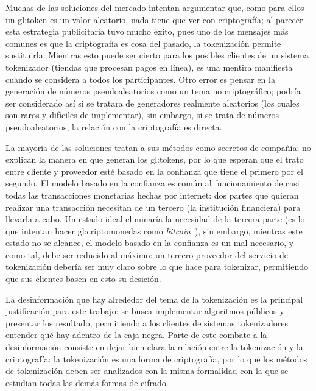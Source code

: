\begin{description}

\end{description}

Muchas de las soluciones del mercado intentan argumentar que, como para ellos
un \gls{gl:token} es un valor aleatorio, nada tiene que ver con criptografía;
al parecer esta estrategia publicitaria tuvo mucho éxito, pues uno de los
mensajes más comunes es que la criptografía es cosa del pasado, la tokenización
permite sustituirla. Mientras esto puede ser cierto para los posibles clientes
de un sistema tokenizador (tiendas que procesan pagos en línea), es una mentira
manifiesta cuando se considera a todos los  participantes. Otro error es pensar
en la generación de números pseudoaleatorios como un tema no criptográfico;
podría ser considerado así si se tratara de generadores realmente aleatorios
(los cuales son raros y difíciles de  implementar), sin embargo, si se trata de
números pseudoaleatorios, la relación con la criptografía es directa.

La mayoría de las soluciones tratan a sus métodos como secretos de compañía: no
explican la manera en que generan los \glspl{gl:token}, por lo que esperan que
el trato entre cliente y proveedor esté basado en la confianza que tiene el
primero por el segundo. El modelo basado en la confianza es común al
funcionamiento de casi todas las transacciones monetarias hechas por internet:
dos partes que quieran realizar una transacción necesitan de un tercero (la
institución financiera) para llevarla a cabo. Un estado ideal eliminaría la
necesidad de la tercera parte (es lo que intentan hacer
\glspl{gl:criptomoneda} como \textit{bitcoin}~\cite{bitcoin}), sin embargo,
mientras este estado no se alcance, el modelo basado en la confianza es un mal
necesario, y como tal, debe ser reducido al máximo: un tercero proveedor del
servicio de tokenización debería ser muy claro sobre lo que hace para
tokenizar, permitiendo que sus clientes basen en esto su desición.

La desinformación que hay alrededor del tema de la tokenización es la principal
justificación para este trabajo: se busca implementar algoritmos públicos
y presentar los resultado, permitiendo a los clientes de sistemas tokenizadores
entender qué hay adentro de la caja negra. Parte de este combate a la
desinformación consiste en dejar bien clara la relación entre la tokenización y
la criptografía: la tokenización es una forma de criptografía, por lo que los
métodos de tokenización deben ser analizados con la misma formalidad con la que
se estudian todas las demás formas de cifrado.

